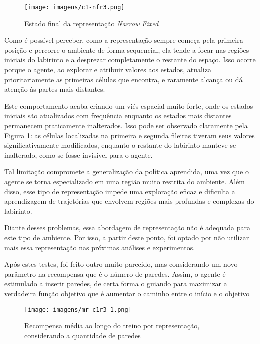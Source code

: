 \begin{figure}[htb]
	\caption{\label{c1-nf}Estado final da representação \textit{Narrow Fixed}}
	\begin{center}
	    \texttt{[image: imagens/c1-nfr3.png]}
	\end{center}
\end{figure}

\FloatBarrier

Como é possível perceber, como a representação sempre começa pela primeira posição e percorre o ambiente de forma sequencial, 
ela tende a focar nas regiões iniciais do labirinto e a desprezar completamente o restante do espaço. 
Isso ocorre porque o agente, ao explorar e atribuir valores aos estados, atualiza prioritariamente as 
primeiras células que encontra, e raramente alcança ou dá atenção às partes mais distantes.



Este comportamento acaba criando um viés espacial muito forte, onde os estados iniciais são 
atualizados com frequência enquanto os estados mais distantes permanecem praticamente inalterados. 
Isso pode ser observado claramente pela Figura \ref{c1-nf}: as células localizadas na primeira e segunda fileiras 
tiveram seus valores significativamente modificados, enquanto o restante do labirinto manteve-se  
inalterado, como se fosse invisível para o agente.

Tal limitação compromete a generalização da política aprendida, uma vez que o agente se torna 
especializado em uma região muito restrita do ambiente. Além disso, esse tipo de representação 
impede uma exploração eficaz e dificulta a aprendizagem de trajetórias que envolvem 
regiões mais profundas e complexas do labirinto.

Diante desses problemas, essa abordagem de representação não é adequada para este tipo de ambiente. 
Por isso, a partir deste ponto, foi optado por não utilizar mais essa representação nas próximas análises e experimentos. 



Após estes testes, foi feito outro muito parecido, mas considerando um novo 
parâmetro na recompensa que é o número de paredes. Assim, o agente é estimulado 
a inserir paredes, de certa forma o guiando para maximizar a verdadeira função objetivo
que é aumentar o caminho entre o início e o objetivo

\begin{figure}[htb]
	\caption{\label{mr_c1r3_1}Recompensa média ao longo do treino por representação, considerando a quantidade de paredes}
	\begin{center}
	    \texttt{[image: imagens/mr\_c1r3\_1.png]}
	\end{center}
\end{figure}


